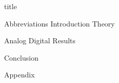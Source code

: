 \documentclass{article}
\begin{document}
{title}

\frontmatter

\tableofcontents

\listoffigures

\mainmatter

{Abbreviations}
{Introduction}
{Theory}

{Analog}
{Digital}
{Results}

{Conclusion}

{Appendix}

\addappendix
%
%
\end{document}
